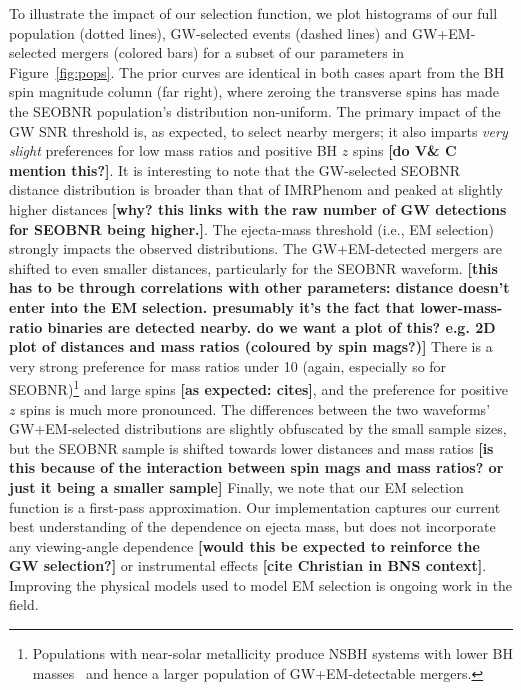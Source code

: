 \documentclass[%
 reprint,
 superscriptaddress,
 nofootinbib,
 amsmath,amssymb,
 aps,
]{revtex4-2}
\begin{document}
To illustrate the impact of our selection function, we plot histograms of our full population (dotted lines), GW-selected events (dashed lines) and GW+EM-selected mergers (colored bars) for a subset of our parameters in Figure~\ref{fig:pops}. The prior curves are identical in both cases apart from the BH spin magnitude column (far right), where zeroing the transverse spins has made the SEOBNR population's distribution non-uniform. The primary impact of the GW SNR threshold is, as expected, to select nearby mergers; it also imparts {\it very slight} preferences for low mass ratios and positive BH $z$ spins {\bf [do V\& C mention this?]}. It is interesting to note that the GW-selected SEOBNR distance distribution is broader than that of IMRPhenom and peaked at slightly higher distances {\bf [why? this links with the raw number of GW detections for SEOBNR being higher.]}. The ejecta-mass threshold (i.e., EM selection) strongly impacts the observed distributions. The GW+EM-detected mergers are shifted to even smaller distances, particularly for the SEOBNR waveform. {\bf [this has to be through correlations with other parameters: distance doesn't enter into the EM selection. presumably it's the fact that lower-mass-ratio binaries are detected nearby. do we want a plot of this? e.g. 2D plot of distances and mass ratios (coloured by spin mags?)]} There is a very strong preference for mass ratios under 10 (again, especially so for SEOBNR)\footnote{Populations with near-solar metallicity produce NSBH systems with lower BH masses~\cite{Kruckow_etal:2018} and hence a larger population of GW+EM-detectable mergers.} and large spins {\bf [as expected: cites]}, and the preference for positive $z$ spins is much more pronounced. The differences between the two waveforms' GW+EM-selected distributions are slightly obfuscated by the small sample sizes, but the SEOBNR sample is shifted towards lower distances and mass ratios {\bf [is this because of the interaction between spin mags and mass ratios? or just it being a smaller sample]} Finally, we note that our EM selection function is a first-pass approximation. Our implementation captures our current best understanding of the dependence on ejecta mass, but does not incorporate any viewing-angle dependence {\bf [would this be expected to reinforce the GW selection?]} or instrumental effects {\bf [cite Christian in BNS context]}. Improving the physical models used to model EM selection is ongoing work in the field.

\end{document}
